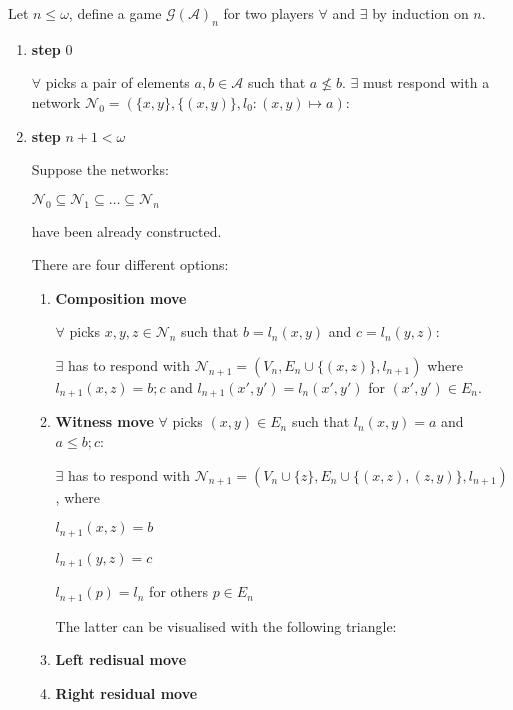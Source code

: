 \documentclass[a4paper]{article}
\theoremstyle{defin}
\theoremstyle{theorem}
\theoremstyle{claim}
\theoremstyle{prop}
\theoremstyle{lemma}
\theoremstyle{fact}
\theoremstyle{ex}
\theoremstyle{col}
\begin{document}
Let $n \leq \omega$, define a game $\mathcal{G}(\mathcal{A})_n$ for two players $\forall$ and $\exists$ by induction on $n$.
\begin{enumerate}
\item {\bf step} 0

$\forall$ picks a pair of elements $a, b \in \mathcal{A}$ such that $a \not\leq b$. $\exists$ must respond with a network $\mathcal{N}_0 = (\{ x, y\}, \{(x,y)\}, l_0 : (x,y) \mapsto a)$:


\item {\bf step} $n + 1 < \omega$

Suppose the networks:
\begin{center}
$\mathcal{N}_0 \subseteq \mathcal{N}_1 \subseteq \dots \subseteq \mathcal{N}_n$
\end{center}
have been already constructed.

There are four different options:
\begin{enumerate}
\item {\bf Composition move}

$\forall$ picks $x, y, z \in \mathcal{N}_n$ such that $b = l_n(x, y)$ and $c = l_n(y, z)$:


$\exists$ has to respond with $\mathcal{N}_{n + 1} = (V_n, E_n \cup \{ (x,z)\}, l_{n+1})$ where $l_{n+1}(x,z) = b ; c$ and $l_{n+1}(x',y') = l_n(x',y')$ for $(x', y') \in E_n$.


\item {\bf Witness move}
$\forall$ picks $(x,y) \in E_n$ such that $l_n(x,y) = a$ and $a \leq b ; c$:


$\exists$ has to respond with $\mathcal{N}_{n + 1} = (V_n \cup \{ z \}, E_n \cup \{ (x,z), (z, y) \}, l_{n + 1})$, where
\begin{center}
$l_{n + 1}(x, z) = b$

$l_{n + 1}(y, z) = c$

$l_{n + 1}(p) = l_n$ for others $p \in E_n$
\end{center}

The latter can be visualised with the following triangle:



\item {\bf Left redisual move}
\item {\bf Right residual move}
\end{enumerate}
\end{enumerate}
\end{document}
